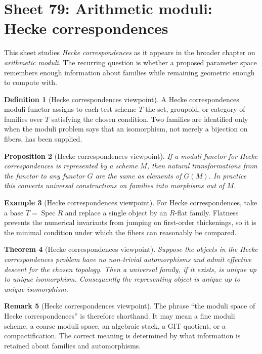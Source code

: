 \documentclass[11pt]{amsart}
\newtheorem{theorem}{Theorem}[section]
\newtheorem{proposition}[theorem]{Proposition}
\theoremstyle{definition}
\newtheorem{definition}[theorem]{Definition}
\newtheorem{example}[theorem]{Example}
\newtheorem{remark}[theorem]{Remark}
\newcommand{\Spec}{\operatorname{Spec}}
\begin{document}
\section{Sheet 79: Arithmetic moduli: Hecke correspondences}
This sheet studies \emph{Hecke correspondences} as it appears in the broader chapter on \emph{arithmetic moduli}.  The recurring question is whether a proposed parameter space remembers enough information about families while remaining geometric enough to compute with.
\begin{definition}[Hecke correspondences viewpoint]
A Hecke correspondences moduli functor assigns to each test scheme $T$ the set, groupoid, or category of families over $T$ satisfying the chosen condition.  Two families are identified only when the moduli problem says that an isomorphism, not merely a bijection on fibers, has been supplied.
\end{definition}
\begin{proposition}[Hecke correspondences viewpoint]
If a moduli functor for Hecke correspondences is represented by a scheme $M$, then natural transformations from the functor to any functor $G$ are the same as elements of $G(M)$.  In practice this converts universal constructions on families into morphisms out of $M$.
\end{proposition}
\begin{example}[Hecke correspondences viewpoint]
For Hecke correspondences, take a base $T=\Spec R$ and replace a single object by an $R$-flat family.  Flatness prevents the numerical invariants from jumping on first-order thickenings, so it is the minimal condition under which the fibers can reasonably be compared.
\end{example}
\begin{theorem}[Hecke correspondences viewpoint]
Suppose the objects in the Hecke correspondences problem have no non-trivial automorphisms and admit effective descent for the chosen topology.  Then a universal family, if it exists, is unique up to unique isomorphism.  Consequently the representing object is unique up to unique isomorphism.
\end{theorem}
\begin{remark}[Hecke correspondences viewpoint]
The phrase ``the moduli space of Hecke correspondences'' is therefore shorthand.  It may mean a fine moduli scheme, a coarse moduli space, an algebraic stack, a GIT quotient, or a compactification.  The correct meaning is determined by what information is retained about families and automorphisms.
\end{remark}
\end{document}
